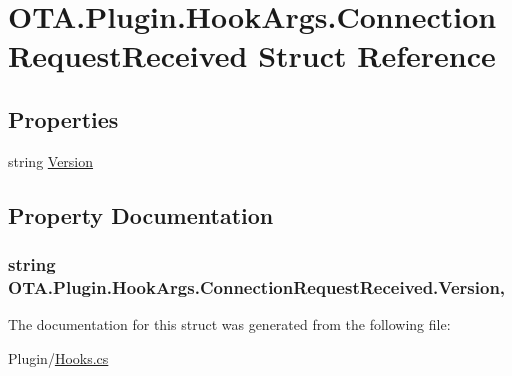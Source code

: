 \hypertarget{struct_o_t_a_1_1_plugin_1_1_hook_args_1_1_connection_request_received}{}\section{O\+T\+A.\+Plugin.\+Hook\+Args.\+Connection\+Request\+Received Struct Reference}
\label{struct_o_t_a_1_1_plugin_1_1_hook_args_1_1_connection_request_received}
\subsection*{Properties}
\begin{DoxyCompactItemize}
\item 
string \hyperlink{struct_o_t_a_1_1_plugin_1_1_hook_args_1_1_connection_request_received_a7f4353376e614b19169dde8ec6cecd11}{Version}
\end{DoxyCompactItemize}


\subsection{Property Documentation}
\hypertarget{struct_o_t_a_1_1_plugin_1_1_hook_args_1_1_connection_request_received_a7f4353376e614b19169dde8ec6cecd11}{}
\subsubsection[{Version}]{\setlength{\rightskip}{0pt plus 5cm}string O\+T\+A.\+Plugin.\+Hook\+Args.\+Connection\+Request\+Received.\+Version\hspace{0.3cm}{\ttfamily [get]}, {\ttfamily [set]}}\label{struct_o_t_a_1_1_plugin_1_1_hook_args_1_1_connection_request_received_a7f4353376e614b19169dde8ec6cecd11}


The documentation for this struct was generated from the following file\+:\begin{DoxyCompactItemize}
\item 
Plugin/\hyperlink{_hooks_8cs}{Hooks.\+cs}\end{DoxyCompactItemize}
